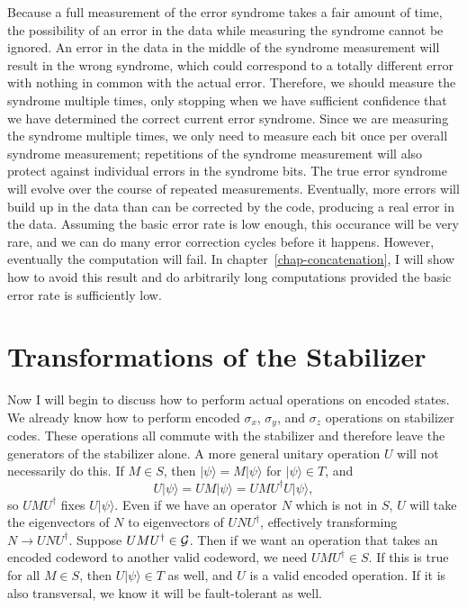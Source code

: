 \documentclass{report}
\newcommand{\G}{{\cal G}}
\newcommand{\ket}[1]{|{#1}\rangle}
\newcommand{\X}{\sigma_x}
\newcommand{\Z}{\sigma_z}
\newcommand{\Y}{\sigma_y}
\begin{document}
Because a full measurement of the error syndrome takes a fair amount of 
time, the possibility of an error in the data while measuring the syndrome 
cannot be ignored.  An error in the data in the middle of the syndrome 
measurement will result in the wrong syndrome, which could correspond 
to a totally different error with nothing in common with the actual error.  
Therefore, we should measure the syndrome multiple times, only stopping 
when we have sufficient confidence that we have determined the correct 
current error syndrome.  Since we are measuring the syndrome multiple 
times, we only need to measure each bit once per overall syndrome 
measurement; repetitions of the syndrome measurement will also protect 
against individual errors in the syndrome bits.  The true error syndrome will 
evolve over the course of repeated measurements.  Eventually, more 
errors will build up in the data than can be corrected by the code, 
producing a real error in the data.  Assuming the basic error rate is low 
enough, this occurance will be very rare, and we can do many error 
correction cycles before it happens.  However, eventually the computation will 
fail.  In chapter~\ref{chap-concatenation}, I will show how to avoid this 
result and do arbitrarily long computations provided the basic error rate is 
sufficiently low.

\section{Transformations of the Stabilizer}
\label{sec-normalizer}

Now I will begin to discuss how to perform actual operations on encoded 
states.  We already know how to perform encoded $\X$, $\Y$, and $\Z$ 
operations on stabilizer codes.  These operations all commute with the
stabilizer and therefore leave the generators of the stabilizer alone.  A 
more general unitary operation $U$ will not necessarily do this.  If $M \in 
S$, then $\ket{\psi} = M \ket{\psi}$ for $\ket{\psi} \in T$, and
\begin{equation}
U \ket{\psi} = U M \ket{\psi} = UMU^\dagger U \ket{\psi},
\end{equation}
so $U M U^\dagger$ fixes $U \ket{\psi}$.  Even if we have an operator $N$
which is not in $S$, $U$ will take the eigenvectors of $N$ to eigenvectors
of $U N U^\dagger$, effectively transforming $N \rightarrow U N U^\dagger$.
Suppose $U M U^\dagger \in \G$.  Then if we want an operation that takes an 
encoded codeword to another valid codeword, we need $U M U^\dagger \in S$.  
If this is true for all $M \in S$, then $U \ket{\psi} \in T$ as well, and $U$ 
is a valid encoded operation.  If it is also transversal, we know it will be 
fault-tolerant as well.
\end{document}
